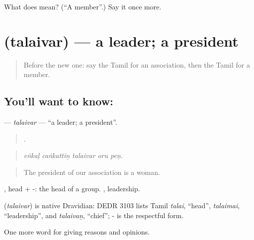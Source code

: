 \begin{tcolorbox}[breakable,colback=teal!4,colframe=teal!35!black,title={Before you move on}]
What does  mean? (\textquotedblleft{}A member\textquotedblright{}.) Say it once more.
\end{tcolorbox}
\section[\texorpdfstring{\ta{தலைவர்} (talaivar)}{தலைவர் (talaivar)}]{ (talaivar) — a leader; a president}

\label{lesson:TA-C378-talaivar}



\begin{quote}
Before the new one: say the Tamil for an association, then the Tamil for a member.
\end{quote}

\subsection*{You'll want to know: }
\textbf{} — \emph{talaivar} — \textquotedblleft{}a leader; a president\textquotedblright{}.

\begin{quote}
    .
\end{quote}

\begin{quote}
\emph{eṅkaḷ caṅkattiṉ talaivar oru peṇ.}
\end{quote}

\begin{quote}
The president of our association is a woman.
\end{quote}

, head + -: the head of a group. , leadership.

\begin{cousinweb}
\textbf{} (\emph{talaivar}) is native Dravidian: DEDR 3103 lists Tamil \emph{talai}, \textquotedblleft{}head\textquotedblright{}, \emph{talaimai}, \textquotedblleft{}leadership\textquotedblright{}, and \emph{talaivaṉ}, \textquotedblleft{}chief\textquotedblright{}; - is the respectful form.
\end{cousinweb}

\begin{grammarlens}[title={What you've built}]
One more word for giving reasons and opinions.
\end{grammarlens}


